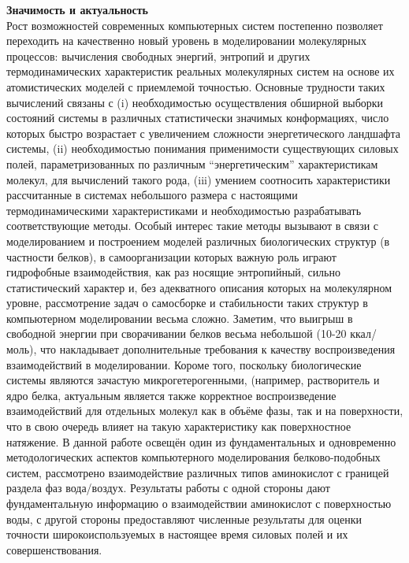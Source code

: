 \textbf{Значимость и актуальность}\\
Рост возможностей современных компьютерных систем постепенно позволяет переходить на качественно новый уровень в моделировании молекулярных процессов: вычисления свободных энергий, энтропий и других термодинамических характеристик реальных молекулярных систем на основе их атомистических моделей с приемлемой точностью. Основные трудности таких вычислений связаны с (i) необходимостью осуществления обширной выборки состояний системы в различных статистически значимых конформациях, число которых быстро возрастает с увеличением сложности энергетического ландшафта системы, (ii) необходимостью понимания применимости существующих силовых полей, параметризованных по различным ``энергетическим'' характеристикам молекул, для вычислений такого рода, 
(iii) умением соотносить характеристики рассчитанные в системах небольшого размера с настоящими термодинамическими характеристиками и необходимостью разрабатывать соответствующие методы.
Особый интерес такие методы вызывают в связи с моделированием и построением моделей различных биологических структур (в частности белков), в самоорганизации которых важную роль играют гидрофобные взаимодействия, как раз носящие энтропийный, сильно статистический характер и, без адекватного описания которых на молекулярном уровне,
рассмотрение задач о самосборке и стабильности таких структур в компьютерном моделировании весьма сложно. Заметим, что выигрыш в свободной энергии при сворачивании белков весьма небольшой (10-20 ккал/моль), что накладывает дополнительные требования к качеству воспроизведения взаимодействий в моделировании. Короме того, поскольку биологические системы являются зачастую микрогетерогенными, (например, растворитель и ядро белка, актуальным является также корректное воспроизведение взаимодействий для отдельных молекул как в объёме фазы, так и на поверхности, что в свою очередь влияет на такую характеристику как поверхностное натяжение.
В данной работе освещён один из фундаментальных и одновременно методологических аспектов компьютерного моделирования белково-подобных систем, рассмотрено взаимодействие различных типов аминокислот с границей раздела фаз вода/воздух. Результаты работы с одной стороны дают фундаментальную информацию о взаимодействии аминокислот с поверхностью воды, с другой стороны предоставляют численные результаты для оценки точности широкоиспользуемых в настоящее время силовых полей и их совершенствования.

